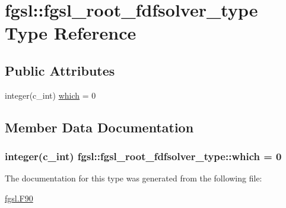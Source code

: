 \hypertarget{structfgsl_1_1fgsl__root__fdfsolver__type}{}\section{fgsl\+:\+:fgsl\+\_\+root\+\_\+fdfsolver\+\_\+type Type Reference}
\label{structfgsl_1_1fgsl__root__fdfsolver__type}
\subsection*{Public Attributes}
\begin{DoxyCompactItemize}
\item 
integer(c\+\_\+int) \hyperlink{structfgsl_1_1fgsl__root__fdfsolver__type_ac92296a50423bdec1a1cf31422f615ff}{which} = 0
\end{DoxyCompactItemize}


\subsection{Member Data Documentation}
\hypertarget{structfgsl_1_1fgsl__root__fdfsolver__type_ac92296a50423bdec1a1cf31422f615ff}{}
\subsubsection[{which}]{\setlength{\rightskip}{0pt plus 5cm}integer(c\+\_\+int) fgsl\+::fgsl\+\_\+root\+\_\+fdfsolver\+\_\+type\+::which = 0}\label{structfgsl_1_1fgsl__root__fdfsolver__type_ac92296a50423bdec1a1cf31422f615ff}


The documentation for this type was generated from the following file\+:\begin{DoxyCompactItemize}
\item 
\hyperlink{fgsl_8F90}{fgsl.\+F90}\end{DoxyCompactItemize}
